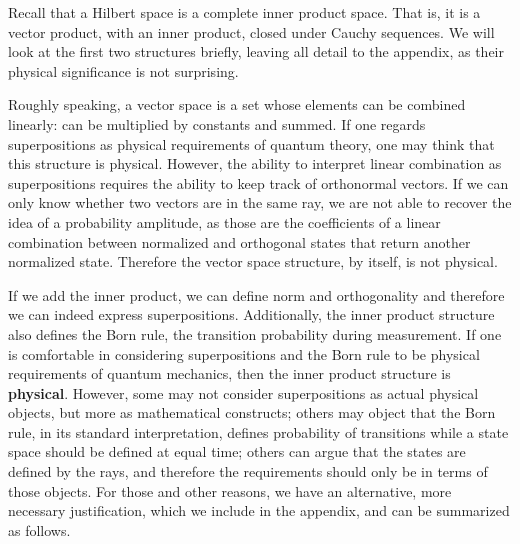 \documentclass[10pt,twocolumn, nofootinbib]{revtex4-2}
\begin{document}
Recall that a Hilbert space is a complete inner product space. That is, it is a vector product, with an inner product, closed under Cauchy sequences. We will look at the first two structures briefly, leaving all detail to the appendix, as their physical significance is not surprising.

Roughly speaking, a vector space is a set whose elements can be combined linearly: can be multiplied by constants and summed. If one regards superpositions as physical requirements of quantum theory, one may think that this structure is physical. However, the ability to interpret linear combination as superpositions requires the ability to keep track of orthonormal vectors. If we can only know whether two vectors are in the same ray, we are not able to recover the idea of a probability amplitude, as those are the coefficients of a linear combination between normalized and orthogonal states that return another normalized state. Therefore the vector space structure, by itself, is not physical.

If we add the inner product, we can define norm and orthogonality and therefore we can indeed express superpositions. Additionally, the inner product structure also defines the Born rule, the transition probability during measurement. If one is comfortable in considering superpositions and the Born rule to be physical requirements of quantum mechanics, then the inner product structure is \textbf{physical}. However, some may not consider superpositions as actual physical objects, but more as mathematical constructs; others may object that the Born rule, in its standard interpretation, defines probability of transitions while a state space should be defined at equal time; others can argue that the states are defined by the rays, and therefore the requirements should only be in terms of those objects. For those and other reasons, we have an alternative, more necessary justification, which we include in the appendix, and can be summarized as follows.
\end{document}

